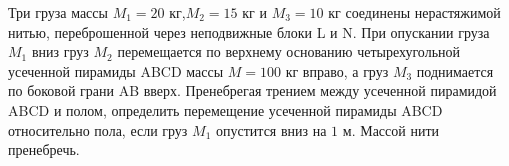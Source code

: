 Три груза массы $M_{1}=20$ кг,$M_{2}=15$ кг и $M_{3}=10$ кг соединены нерастяжимой нитью, переброшенной через неподвижные блоки L и N. При опускании груза $M_{1}$ вниз груз $M_{2}$
перемещается по верхнему основанию четырехугольной усеченной пирамиды ABCD массы $M=100$ кг вправо, а груз $M_{3}$ поднимается по боковой грани AB вверх. Пренебрегая трением между
усеченной пирамидой ABCD и полом, определить перемещение усеченной пирамиды ABCD относительно пола, если груз $M_{1}$ опустится вниз на $1$ м. Массой нити пренебречь.